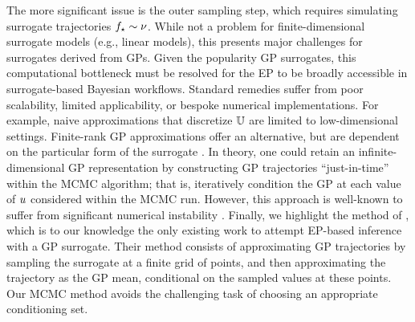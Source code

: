 \documentclass[12pt]{article}
\begin{document}
The more significant issue is the outer sampling step, which requires simulating surrogate 
trajectories ${f}_{\star} \sim \nu$. While not a problem for finite-dimensional 
surrogate models (e.g., linear models), this presents major challenges for surrogates 
derived from GPs. Given the popularity GP surrogates, 
this computational bottleneck must be resolved for the EP to be broadly accessible in 
surrogate-based Bayesian workflows. Standard remedies suffer from poor scalability,
limited applicability, or bespoke numerical implementations. For example, naive 
approximations that discretize $\mathbb{U}$ are limited to low-dimensional settings.
Finite-rank GP approximations offer an alternative, but are dependent on the 
particular form of the surrogate \citep{pathwiseConditioning}. In theory, one 
could retain an infinite-dimensional GP representation by constructing 
GP trajectories ``just-in-time'' within the MCMC algorithm; that is, iteratively
condition the GP at each value of $u$ considered within the MCMC run.
However, this approach is well-known to suffer from significant numerical 
instability \citep{pathwiseConditioning}. Finally, we highlight the method of 
\citet{trainDynamics}, which is to our knowledge the only existing work to 
attempt EP-based inference with a GP surrogate. 
Their method consists of approximating GP 
trajectories by sampling the surrogate at a finite grid of points, 
and then approximating the trajectory as the GP mean, conditional on the 
sampled values at these points. Our MCMC method avoids the challenging 
task of choosing an appropriate conditioning set.
\end{document}
